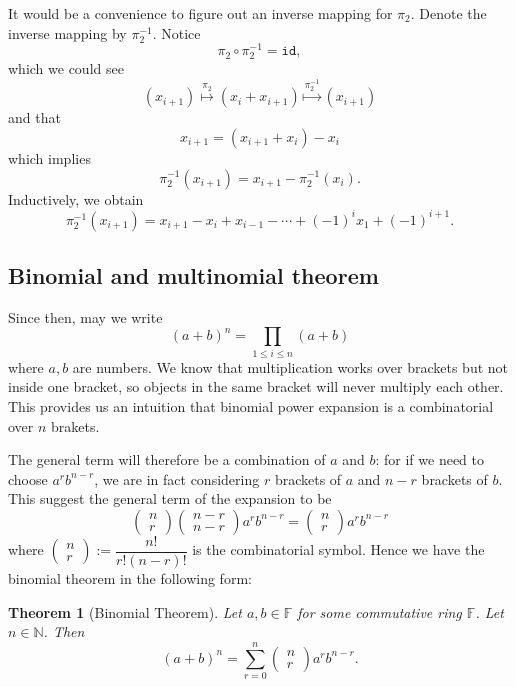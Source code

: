 \documentclass[12pt]{article}
\newcommand{\id}{\mathtt{id}}
\newtheorem*{theorem}{Theorem}
\begin{document}
    It would be a convenience to figure out an inverse mapping for $\pi_2$. Denote the inverse mapping by $\pi_2^{-1}$. Notice \[\pi_2\circ\pi_2^{-1}=\id,\] which we could see \[(x_{i+1})\overset{\pi_2}{\mapsto}(x_i+x_{i+1})\overset{\pi_2^{-1}}{\mapsto} (x_{i+1})\] and that \[x_{i+1}=(x_{i+1}+x_{i})-x_i\] which implies \[\pi_2^{-1}(x_{i+1})=x_{i+1}-\pi_2^{-1}(x_i).\] Inductively, we obtain \[\pi_2^{-1}(x_{i+1})=x_{i+1}-x_i+x_{i-1}-\cdots+(-1)^i x_1+(-1)^{i+1}.\]

    \subsection{Binomial and multinomial theorem}

    Since then, may we write \[(a+b)^n=\prod_{1\leq i\leq n}(a+b)\] where $a,b$ are numbers. We know that multiplication works over brackets but not inside one bracket, so objects in the same bracket will never multiply each other. This provides us an intuition that binomial power expansion is a combinatorial over $n$ brakets.
    
    The general term will therefore be a combination of $a$ and $b$: for if we need to choose $a^rb^{n-r}$, we are in fact considering $r$ brackets of $a$ and $n-r$ brackets of $b$. This suggest the general term of the expansion to be \[\begin{pmatrix}
        n\\r
    \end{pmatrix}\begin{pmatrix}
        n-r\\n-r
    \end{pmatrix}a^r b^{n-r}=\begin{pmatrix}
        n\\r
    \end{pmatrix}a^r b^{n-r}\] where $\begin{pmatrix}
        n\\r
    \end{pmatrix}:=\dfrac{n!}{r!(n-r)!}$ is the combinatorial symbol. Hence we have the binomial theorem in the following form:

    \begin{theorem}[Binomial Theorem]
        Let $a,b\in\mathbb{F}$ for some commutative ring $\mathbb{F}$. Let $n\in\mathbb{N}$. Then \[(a+b)^n=\sum_{r=0}^{n}\begin{pmatrix}
            n\\r
        \end{pmatrix}a^r b^{n-r}.\]
    \end{theorem}
\end{document}
